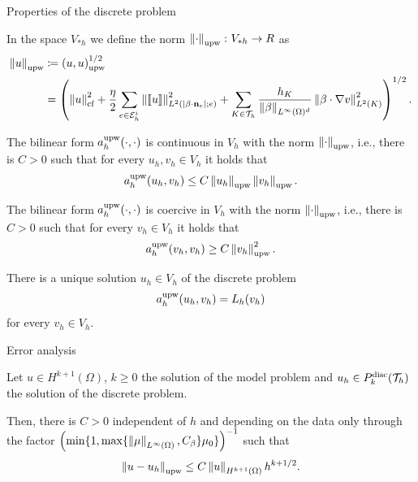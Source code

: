	\begin{frame}[allowframebreaks]{Properties of the discrete problem}
	\begin{definicion}
		In the space $V_{*h}$ we define the norm $\left\|\cdot\right\|_{\text{upw}}\colon V_{*h}\to\relax R$ as {\footnotesize 
		\begin{align*}
		\left\|u\right\|_{\text{upw}}&\coloneqq\left(u,u\right)_\text{upw}^{1/2}\\&= \left(\left\|u\right\|_{\text{cf}}^2+\frac{\eta}{2}\sum_{e\in\mathcal{E}_h^i}\left\|\left[\!\left[u\right]\!\right]\right\|^2_{L^2(|\beta\cdot\mathbf{n}_e|;e)} + \sum_{K\in\mathcal{T}_h}\frac{h_K}{\left\|\beta\right\|_{L^\infty(\Omega)^d}}\left\|\beta\cdot\nabla v\right\|_{L^2(K)}^2 \right)^{1/2}.
		\end{align*}}
	\end{definicion}
	\framebreak
	\begin{lemma}
		The bilinear form $a_h^{\text{upw}}(\cdot,\cdot)$ is continuous in $V_h$ with the norm $\left\|\cdot\right\|_{\text{upw}}$, i.e., there is $C>0$ such that for every $u_h,v_h\in V_h$ it holds that $$a_h^{\text{upw}}(u_h,v_h)\leq C\left\|u_h\right\|_{\text{upw}}\left\|v_h\right\|_{\text{upw}}.$$
	\end{lemma}
	
	\begin{proposition}
		The bilinear form $a_h^{\text{upw}}(\cdot,\cdot)$ is coercive in $V_h$ with the norm $\left\|\cdot\right\|_{\text{upw}}$, i.e., there is $C>0$ such that for every $v_h\in V_h$ it holds that $$a_h^{\text{upw}}(v_h,v_h)\geq C\left\|v_h\right\|_{\text{upw}}^2.$$
	\end{proposition}
	\framebreak
	\begin{lemma}
		There is a unique solution $u_h\in V_h$ of the discrete problem $$a_h^{\text{upw}}(u_h,v_h)=L_h(v_h)$$ for every $v_h\in V_h$.
	\end{lemma}
	\end{frame}
	
	\begin{frame}{Error analysis}
	\begin{theorem}
		Let $u\in H^{k+1}(\Omega)$, $k\ge 0$ the solution of the model problem and $u_h\in \relax{P}^{\text{disc}}_k(\mathcal{T}_h)$ the solution of the discrete problem.
		
		Then, there is $C>0$ independent of $h$ and depending on the data only through the factor  $\left(\min\{1,\max\{\left\|\mu\right\|_{L^\infty(\Omega)},C_\beta\}\mu_0\}\right)^{-1}$ such that $$\left\|u-u_h\right\|_{\text{upw}}\leq C\left\|u\right\|_{H^{k+1}(\Omega)}h^{k+1/2}.$$
	\end{theorem}
\end{frame}

